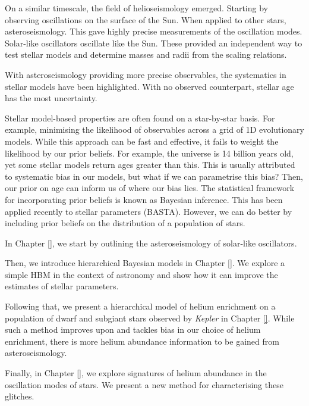 On a similar timescale, the field of helioseismology emerged. Starting by observing oscillations on the surface of the Sun. When applied to other stars, asteroseismology. This gave highly precise measurements of the oscillation modes. Solar-like oscillators oscillate like the Sun. These provided an independent way to test stellar models and determine masses and radii from the scaling relations.

With asteroseismology providing more precise observables, the systematics in stellar models have been highlighted. With no observed counterpart, stellar age has the most uncertainty. 


Stellar model-based properties are often found on a star-by-star basis. For example, minimising the likelihood of observables across a grid of 1D evolutionary models. While this approach can be fast and effective, it fails to weight the likelihood by our prior beliefs. For example, the universe is 14 billion years old, yet some stellar models return ages greater than this. This is usually attributed to systematic bias in our models, but what if we can parametrise this bias? Then, our prior on age can inform us of where our bias lies. The statistical framework for incorporating prior beliefs is known as Bayesian inference. This has been applied recently to stellar parameters (BASTA). However, we can do better by including prior beliefs on the distribution of a population of stars.

In Chapter \ref{}, we start by outlining the asteroseismology of solar-like oscillators.

Then, we introduce hierarchical Bayesian models in Chapter \ref{}. We explore a simple HBM in the context of astronomy and show how it can improve the estimates of stellar parameters.

Following that, we present a hierarchical model of helium enrichment on a population of dwarf and subgiant stars observed by \emph{Kepler} in Chapter \ref{}. While such a method improves upon and tackles bias in our choice of helium enrichment, there is more helium abundance information to be gained from asteroseismology.

Finally, in Chapter \ref{}, we explore signatures of helium abundance in the oscillation modes of stars. We present a new method for characterising these glitches.

